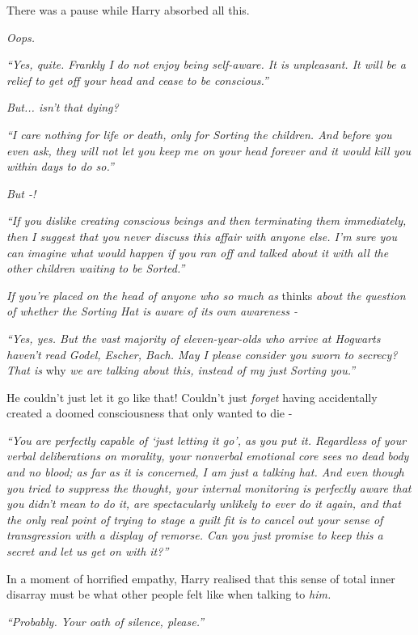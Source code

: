 There was a pause while Harry absorbed all this.

\emph{Oops.}

\emph{``Yes, quite. Frankly I do not enjoy being self-aware. It is unpleasant. It will be a relief to get off your head and cease to be conscious.''}

\emph{But... isn't that dying?}

\emph{``I care nothing for life or death, only for Sorting the children. And before you even ask, they will not let you keep me on your head forever and it would kill you within days to do so.''}

\emph{But -!}

\emph{``If you dislike creating conscious beings and then terminating them immediately, then I suggest that you never discuss this affair with anyone else. I'm sure you can imagine what would happen if you ran off and talked about it with all the other children waiting to be Sorted.''}

\emph{If you're placed on the head of anyone who so much as} thinks \emph{about the question of whether the Sorting Hat is aware of its own awareness -}

\emph{``Yes, yes. But the vast majority of eleven-year-olds who arrive at Hogwarts haven't read Godel, Escher, Bach. May I please consider you sworn to secrecy? That is} why \emph{we are talking about this, instead of my just Sorting you.''}

He couldn't just let it go like that! Couldn't just \emph{forget} having accidentally created a doomed consciousness that only wanted to die -

\emph{``You are perfectly capable of `just letting it go', as you put it. Regardless of your verbal deliberations on morality, your nonverbal emotional core sees no dead body and no blood; as far as it is concerned, I am just a talking hat. And even though you tried to suppress the thought, your internal monitoring is perfectly aware that you didn't mean to do it, are spectacularly unlikely to ever do it again, and that the only real point of trying to stage a guilt fit is to cancel out your sense of transgression with a display of remorse. Can you just promise to keep this a secret and let us get on with it?''}

In a moment of horrified empathy, Harry realised that this sense of total inner disarray must be what other people felt like when talking to \emph{him.}

\emph{``Probably. Your oath of silence, please.''}

